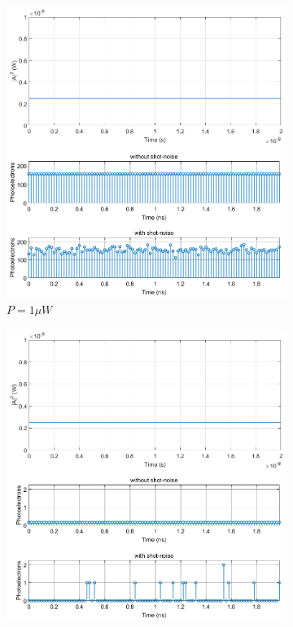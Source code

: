 \begin{figure}[H]
	\centering
	\begin{subfigure}{0.45\textwidth}
		\includegraphics[width=\textwidth]{./lib/photoelectron_generator/figures/plot-constant-1uW}
		\caption{$P=1 \mu W$}
	\end{subfigure}
	\hspace{10mm}
	\begin{subfigure}{0.45\textwidth}
		\includegraphics[width=\textwidth]{./lib/photoelectron_generator/figures/plot-constant-1nW}

\end{subfigure}
\end{figure}
